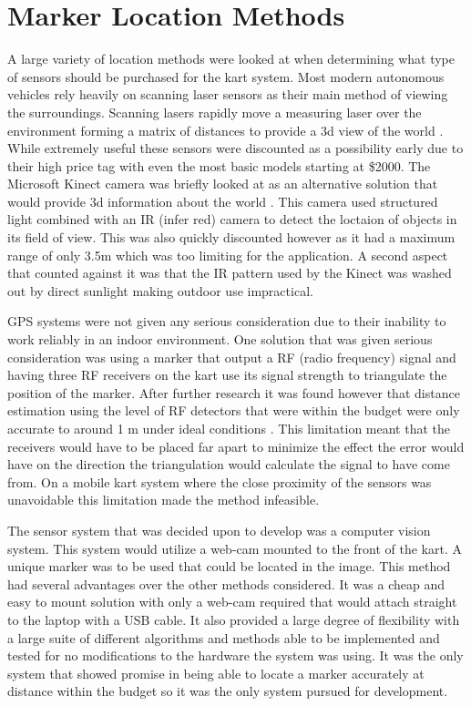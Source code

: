 \section{Marker Location Methods}

A large variety of location methods were looked at when determining what type of sensors should be purchased for the kart system. Most modern autonomous vehicles rely heavily on scanning laser sensors as their main method of viewing the surroundings. Scanning lasers rapidly move a measuring laser over the environment forming a matrix of distances to provide a 3d view of the world \cite{laser}. While extremely useful these sensors were discounted as a possibility early due to their high price tag with even the most basic models starting at \$2000. The Microsoft Kinect camera was briefly looked at as an alternative solution that would provide 3d information about the world \cite{kinect}. This camera used structured light combined with an IR (infer red) camera to detect the loctaion of objects in its field of view. This was also quickly discounted however as it had a maximum range of only 3.5m which was too limiting for the application. A second aspect that counted against it was that the IR pattern used by the Kinect was washed out by direct sunlight making outdoor use impractical.

GPS systems were not given any serious consideration due to their inability to work reliably in an indoor environment. One solution that was given serious consideration was using a marker that output a RF (radio frequency) signal and having three RF receivers on the kart use its signal strength to triangulate the position of the marker. After further research it was found however that distance estimation using the level of RF detectors that were within the budget were only accurate to around 1 m under ideal conditions \cite{rf}. This limitation meant that the receivers would have to be placed far apart to minimize the effect the error would have on the direction the triangulation would calculate the signal to have come from. On a mobile kart system where the close proximity of the sensors was unavoidable this limitation made the method infeasible.

The sensor system that was decided upon to develop was a computer vision system. This system would utilize a web-cam mounted to the front of the kart. A unique marker was to be used that could be located in the image. This method had several advantages over the other methods considered. It was a cheap and easy to mount solution with only a web-cam required that would attach straight to the laptop with a USB cable. It also provided a large degree of flexibility with a large suite of different algorithms and methods able to be implemented and tested for no modifications to the hardware the system was using. It was the only system that showed promise in being able to locate a marker accurately at distance within the budget so it was the only system pursued for development.